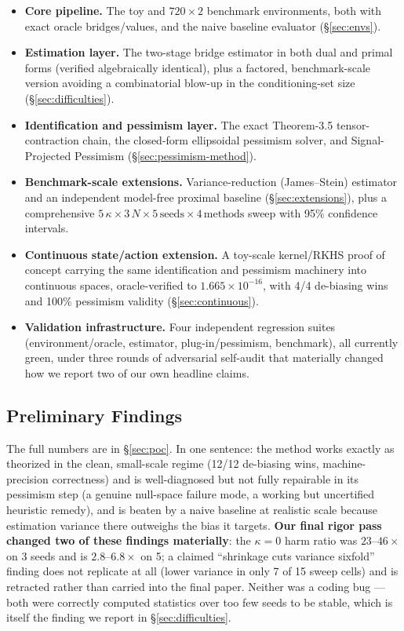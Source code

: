 \documentclass[11pt]{article}
\begin{document}
\begin{itemize}
  \item \textbf{Core pipeline.} The toy and $720\times2$ benchmark environments, both with
  exact oracle bridges/values, and the naive baseline evaluator (\S\ref{sec:envs}).
  \item \textbf{Estimation layer.} The two-stage bridge estimator in both dual and primal
  forms (verified algebraically identical), plus a factored, benchmark-scale version
  avoiding a combinatorial blow-up in the conditioning-set size (\S\ref{sec:difficulties}).
  \item \textbf{Identification and pessimism layer.} The exact Theorem-3.5
  tensor-contraction chain, the closed-form ellipsoidal pessimism solver, and Signal-
  Projected Pessimism (\S\ref{sec:pessimism-method}).
  \item \textbf{Benchmark-scale extensions.} Variance-reduction (James--Stein) estimator
  and an independent model-free proximal baseline (\S\ref{sec:extensions}), plus a
  comprehensive $5\,\kappa \times 3\,N \times 5\,\text{seeds} \times 4\,\text{methods}$
  sweep with 95\% confidence intervals.
  \item \textbf{Continuous state/action extension.} A toy-scale kernel/RKHS proof of
  concept carrying the same identification and pessimism machinery into continuous
  spaces, oracle-verified to $1.665\times10^{-16}$, with 4/4 de-biasing wins and 100\%
  pessimism validity (\S\ref{sec:continuous}).
  \item \textbf{Validation infrastructure.} Four independent regression suites
  (environment/oracle, estimator, plug-in/pessimism, benchmark), all currently green,
  under three rounds of adversarial self-audit that materially changed how we report two
  of our own headline claims.
\end{itemize}

\subsection{Preliminary Findings}

The full numbers are in \S\ref{sec:poc}. In one sentence: the method works exactly as
theorized in the clean, small-scale regime (12/12 de-biasing wins, machine-precision
correctness) and is well-diagnosed but not fully repairable in its pessimism step (a
genuine null-space failure mode, a working but uncertified heuristic remedy), and is beaten
by a naive baseline at realistic scale because estimation variance there outweighs the bias
it targets. \textbf{Our final rigor pass changed two of these findings materially}: the
$\kappa{=}0$ harm ratio was $23$--$46\times$ on 3 seeds and is $2.8$--$6.8\times$ on 5; a
claimed ``shrinkage cuts variance sixfold'' finding does not replicate at all (lower
variance in only 7 of 15 sweep cells) and is retracted rather than carried into the final
paper. Neither was a coding bug --- both were correctly computed statistics over too few
seeds to be stable, which is itself the finding we report in \S\ref{sec:difficulties}.
\end{document}
